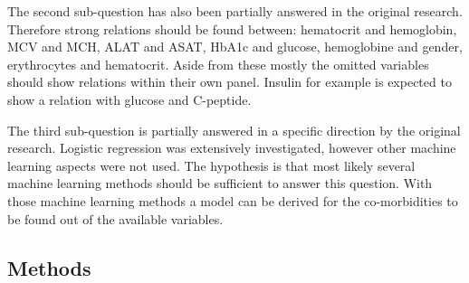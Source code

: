 \documentclass[10pt,a4paper]{article}
\begin{document}
	The second sub-question has also been partially answered in the original research. Therefore strong relations should be found between: hematocrit and hemoglobin, MCV and MCH, ALAT and ASAT, HbA1c and glucose, hemoglobine and gender, erythrocytes and hematocrit. Aside from these mostly the omitted variables should show relations within their own panel. Insulin for example is expected to show a relation with glucose and C-peptide.
	
	The third sub-question is partially answered in a specific direction by the original research. Logistic regression was extensively investigated, however other machine learning aspects were not used. The hypothesis is that most likely several machine learning methods should be sufficient to answer this question. With those machine learning methods a model can be derived for the co-morbidities to be found out of the available variables.
	 
	
	
	
	
	
	\subsection{Methods}
	
	
	
	
	 
	
	
\end{document}

